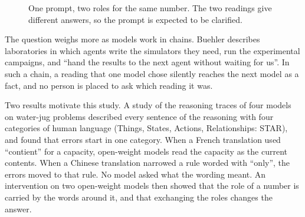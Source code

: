 \documentclass[11pt,a4paper]{article}
\begin{document}
\begin{figure}[t]
\centering
{}
\caption{One prompt, two roles for the same number. The two readings give
different answers, so the prompt is expected to be clarified.}
\label{fig:readings}
\end{figure}

The question weighs more as models work in chains. Buehler
\cite{buehler2026making} describes laboratories in which agents write the
simulators they need, run the experimental campaigns, and ``hand the
results to the next agent without waiting for us''. In such a chain, a
reading that one model chose silently reaches the next model as a fact,
and no person is placed to ask which reading it was.

Two results motivate this study. A study of the reasoning traces of four
models on water-jug problems \cite{dubray2026grammarllm} described every
sentence of the reasoning with four categories of human language (Things,
States, Actions, Relationships: STAR), and found that errors start in one
category. When a French translation used ``contient'' for a capacity,
open-weight models read the capacity as the current contents. When a
Chinese translation narrowed a rule worded with ``only'', the errors moved
to that rule. No model asked what the wording meant. An intervention on
two open-weight models then showed that the role of a number is carried by
the words around it, and that exchanging the roles changes the answer.
\end{document}
